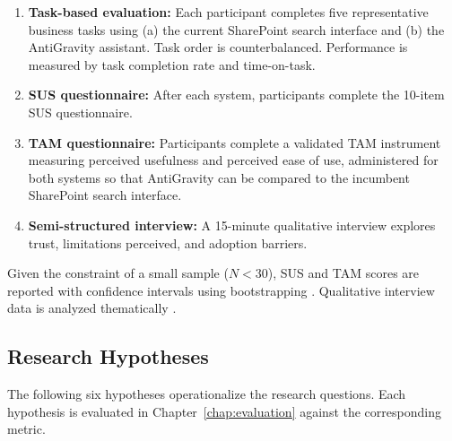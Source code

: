 \begin{enumerate}
  \item \textbf{Task-based evaluation:} Each participant completes five representative business tasks using (a) the current SharePoint search interface and (b) the AntiGravity assistant. Task order is counterbalanced. Performance is measured by task completion rate and time-on-task.
  \item \textbf{SUS questionnaire:} After each system, participants complete the 10-item SUS questionnaire.
  \item \textbf{TAM questionnaire:} Participants complete a validated TAM instrument \citep{Davis1989TAM} measuring perceived usefulness and perceived ease of use, administered for both systems so that AntiGravity can be compared to the incumbent SharePoint search interface.
  \item \textbf{Semi-structured interview:} A 15-minute qualitative interview explores trust, limitations perceived, and adoption barriers.
\end{enumerate}

Given the constraint of a small sample ($N < 30$), SUS and TAM scores are reported with confidence intervals using bootstrapping \citep{Efron1993Bootstrap}. Qualitative interview data is analyzed thematically \citep{Braun2006}.

\subsection{Research Hypotheses}
\label{sec:method-hypotheses}

The following six hypotheses operationalize the research questions. Each hypothesis is evaluated in Chapter~\ref{chap:evaluation} against the corresponding metric.

